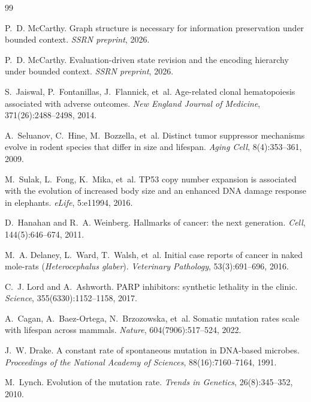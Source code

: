 \documentclass[11pt]{article}
\theoremstyle{definition}
\begin{document}

\begin{thebibliography}{99}

P.~D. McCarthy.
\newblock Graph structure is necessary for information preservation
under bounded context.
\newblock \emph{SSRN preprint}, 2026.

P.~D. McCarthy.
\newblock Evaluation-driven state revision and the encoding hierarchy
under bounded context.
\newblock \emph{SSRN preprint}, 2026.

S.~Jaiswal, P.~Fontanillas, J.~Flannick, et~al.
\newblock Age-related clonal hematopoiesis associated with adverse
outcomes.
\newblock \emph{New England Journal of Medicine}, 371(26):2488--2498, 2014.

A.~Seluanov, C.~Hine, M.~Bozzella, et~al.
\newblock Distinct tumor suppressor mechanisms evolve in rodent species
that differ in size and lifespan.
\newblock \emph{Aging Cell}, 8(4):353--361, 2009.

M.~Sulak, L.~Fong, K.~Mika, et~al.
\newblock TP53 copy number expansion is associated with the evolution
of increased body size and an enhanced DNA damage response in elephants.
\newblock \emph{eLife}, 5:e11994, 2016.

D.~Hanahan and R.~A. Weinberg.
\newblock Hallmarks of cancer: the next generation.
\newblock \emph{Cell}, 144(5):646--674, 2011.

M.~A. Delaney, L.~Ward, T.~Walsh, et~al.
\newblock Initial case reports of cancer in naked mole-rats
(\textit{Heterocephalus glaber}).
\newblock \emph{Veterinary Pathology}, 53(3):691--696, 2016.

C.~J. Lord and A.~Ashworth.
\newblock PARP inhibitors: synthetic lethality in the clinic.
\newblock \emph{Science}, 355(6330):1152--1158, 2017.

A.~Cagan, A.~Baez-Ortega, N.~Brzozowska, et~al.
\newblock Somatic mutation rates scale with lifespan across mammals.
\newblock \emph{Nature}, 604(7906):517--524, 2022.

J.~W. Drake.
\newblock A constant rate of spontaneous mutation in DNA-based microbes.
\newblock \emph{Proceedings of the National Academy of Sciences},
88(16):7160--7164, 1991.

M.~Lynch.
\newblock Evolution of the mutation rate.
\newblock \emph{Trends in Genetics}, 26(8):345--352, 2010.


\end{thebibliography}
\end{document}
